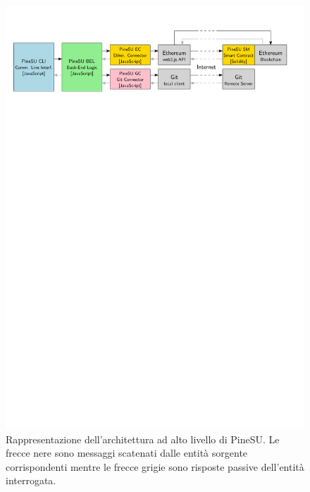\begin{figure}[H]
    \centering
    \includegraphics[width=\textwidth]{Figures/PineSU-architecture}
    \caption{\small{
    Rappresentazione dell’architettura ad alto livello di PineSU. 
    Le frecce nere sono messaggi scatenati dalle entità sorgente corrispondenti
    mentre le frecce grigie sono risposte passive dell’entità interrogata.
    } %
    } %
    \label{fi:arch}
\end{figure}

